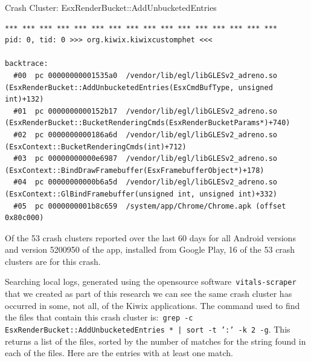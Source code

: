 \begin{listing}[H]
\caption{Crash Cluster: EsxRenderBucket::AddUnbucketedEntries} \label{code:crash_cluster_add_unbucketed_entries}
\tiny
\begin{verbatim}
*** *** *** *** *** *** *** *** *** *** *** *** *** *** *** ***
pid: 0, tid: 0 >>> org.kiwix.kiwixcustomphet <<<

backtrace:
  #00  pc 00000000001535a0  /vendor/lib/egl/libGLESv2_adreno.so (EsxRenderBucket::AddUnbucketedEntries(EsxCmdBufType, unsigned int)+132)
  #01  pc 0000000000152b17  /vendor/lib/egl/libGLESv2_adreno.so (EsxRenderBucket::BucketRenderingCmds(EsxRenderBucketParams*)+740)
  #02  pc 0000000000186a6d  /vendor/lib/egl/libGLESv2_adreno.so (EsxContext::BucketRenderingCmds(int)+712)
  #03  pc 00000000000e6987  /vendor/lib/egl/libGLESv2_adreno.so (EsxContext::BindDrawFramebuffer(EsxFramebufferObject*)+178)
  #04  pc 00000000000b6a5d  /vendor/lib/egl/libGLESv2_adreno.so (EsxContext::GlBindFramebuffer(unsigned int, unsigned int)+332)
  #05  pc 0000000001b8c659  /system/app/Chrome/Chrome.apk (offset 0x80c000)
\end{verbatim}

\end{listing}

Of the 53 crash clusters reported over the last 60 days for all Android versions and version 5200950 of the app, installed from Google Play, 16 of the 53 crash clusters are for this crash.

Searching local logs, generated using the opensource software~\texttt{vitals-scraper} that we created as part of this research we can see the same crash cluster has occurred in some, not all, of the Kiwix applications. The command used to find the files that contain this crash cluster is:~\texttt{grep -c EsxRenderBucket::AddUnbucketedEntries * | sort -t ':' -k 2 -g}. This returns a list of the files, sorted by the number of matches for the string found in each of the files. Here are the entries with at least one match.

